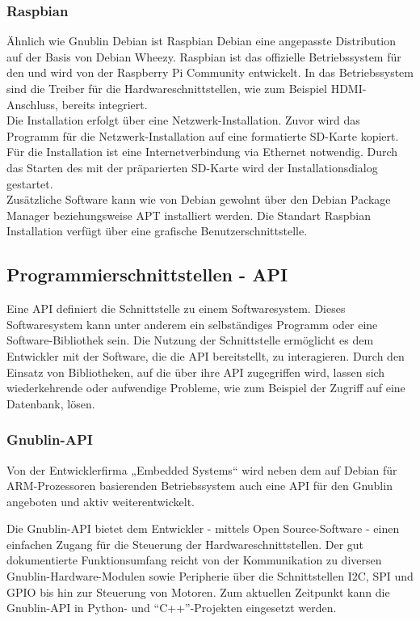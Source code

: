 \documentclass[../Bachelorarbeit.tex]{subfiles}
\begin{document}
\subsubsection*{Raspbian}
Ähnlich wie Gnublin Debian ist Raspbian Debian eine angepasste Distribution auf der 
Basis von Debian Wheezy. Raspbian ist das offizielle Betriebssystem für den 
und wird von der Raspberry Pi Community entwickelt. In das Betriebssystem sind die 
Treiber für die Hardwareschnittstellen, wie zum Beispiel HDMI-Anschluss, bereits 
integriert.\\
Die Installation erfolgt über eine Netzwerk-Installation. Zuvor wird das Programm für die Netzwerk-Installation auf eine formatierte SD-Karte kopiert. Für die Installation ist eine Internetverbindung via Ethernet notwendig. Durch das Starten des  mit der präparierten SD-Karte wird der Installationsdialog gestartet.\\
Zusätzliche Software kann wie von Debian gewohnt über den Debian Package Manager 
beziehungsweise \ac{APT} installiert werden. Die Standart Raspbian Installation verfügt über eine grafische Benutzerschnittstelle.

\subsection{Programmierschnittstellen - \acf{API}}
Eine \acs{API} definiert die Schnittstelle zu einem Softwaresystem. Dieses Softwaresystem kann unter anderem ein selbständiges Programm oder eine Software-Bibliothek sein. Die Nutzung der Schnittstelle ermöglicht es dem Entwickler mit der Software, die die \acs{API} bereitstellt, zu interagieren. Durch den Einsatz von Bibliotheken, auf die über ihre \acs{API} zugegriffen wird, lassen sich wiederkehrende oder aufwendige Probleme, wie zum Beispiel der Zugriff auf eine Datenbank, lösen. 

\subsubsection*{Gnublin-\ac{API}} 
\label{para:gnublin-api}
Von der Entwicklerfirma „Embedded Systems“ wird neben dem auf Debian für \ac{ARM}-Prozessoren basierenden Betriebssystem auch eine \acs{API} für den Gnublin angeboten und aktiv weiterentwickelt. 
\begin{comment}
Die Gnublin-API bietet dem Entwickler einen einfachen Open Source-Zugang für die Steuerung der Hardwareschnittstellen. 
\end{comment}
Die Gnublin-API bietet dem Entwickler - mittels Open Source-Software - einen einfachen Zugang für die Steuerung der Hardwareschnittstellen. 
Der gut dokumentierte Funktionsumfang reicht von der Kommunikation zu diversen Gnublin-Hardware-Modulen sowie Peripherie über die Schnittstellen \ac{I2C}, \ac{SPI} und \ac{GPIO} bis hin zur Steuerung von Motoren. 
Zum aktuellen Zeitpunkt kann die Gnublin-API in Python- und "`C++"'-Projekten eingesetzt werden.
\end{document}
